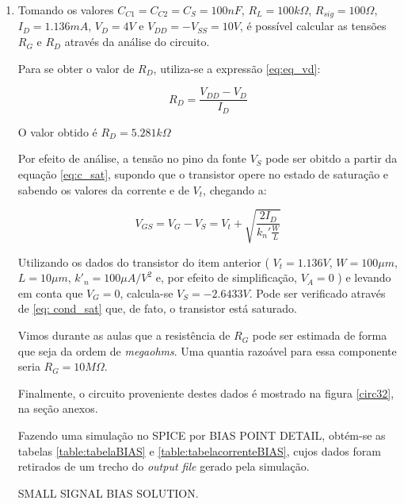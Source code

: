 \documentclass[12pt, a4paper]{article}
\begin{document}
\begin{enumerate}
       \item Tomando os valores \(C_{C1} = C_{C2} = C_{S} = 100nF\), \(R_L = 100k\Omega \), \(R_{sig} = 100\Omega \), \(I_D = 1.136 mA \), \(V_{D} = 4V \) e \(V_{DD} = -V_{SS} = 10V\), é possível calcular as tensões \(R_G\) e \(R_D\) através da análise do circuito. 
       
       Para se obter o valor de \(R_D\), utiliza-se a expressão \ref{eq:eq_vd}:
       
       \begin{equation} \label{eq:eq_vd}
       R_D = \frac{V_{DD}-V_D}{I_D}       
       \end{equation}
       
       O valor obtido é \(R_D = 5.281k\Omega \)
       
       
       
       Por efeito de análise, a tensão no pino da fonte \(V_S\) pode ser obitdo a partir da equação \ref{eq:c_sat}, supondo que o transistor opere no estado de saturação e sabendo os valores da corrente e de \(V_t\), chegando a:
       
       \begin{equation}
       V_{GS} = V_G - V_S = V_t + \sqrt{\frac{2I_D}{k_n'\frac{W}{L}}} 
        \end{equation}
       
       Utilizando os dados do transistor do item anterior ( \(V_t = 1.136 V\), \(W = 100 \mu m\), \(L = 10 \mu m\), \(k'_n = 100 \mu A/V^2\) e, por efeito de simplificação, \(V_A = 0\) ) e levando em conta que \(V_G = 0\), calcula-se \(V_S = -2.6433V\). Pode ser verificado através de \ref{eq: cond_sat} que, de fato, o transistor está saturado.
       
       
       Vimos durante as aulas que a resistência de \(R_G\) pode ser estimada de forma que seja da ordem de \textit{megaohms}. Uma quantia razoável para essa componente seria \(R_G = 10M\Omega \). 
       
       Finalmente, o circuito proveniente destes dados é mostrado na figura \ref{circ32}, na seção anexos.
       
       Fazendo uma simulação no SPICE por BIAS POINT DETAIL, obtém-se as tabelas \ref{table:tabelaBIAS} e \ref{table:tabelacorrenteBIAS}, cujos dados foram retirados de um trecho do \textit{output file} gerado pela simulação.
       
       
        \begin{table} [h!]
            \caption{SMALL SIGNAL BIAS SOLUTION. } \\
            \centering
            \label{table:tabelaBIAS}
            

\end{table}
\end{enumerate}
\end{document}
